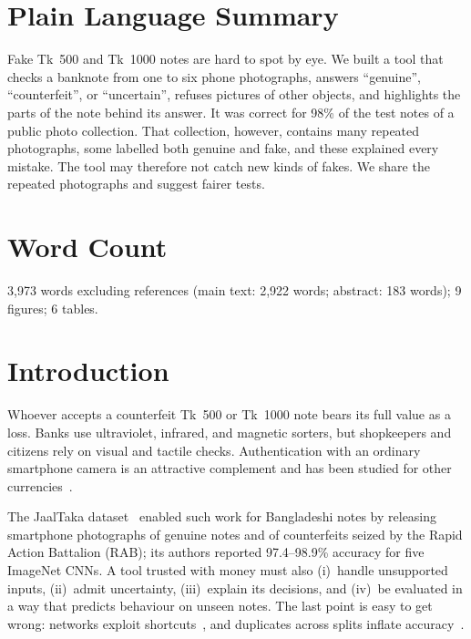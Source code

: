 \documentclass[pdflatex,sn-mathphys-num]{sn-jnl}
\begin{document}
\section*{Plain Language Summary}
Fake Tk~500 and Tk~1000 notes are hard to spot by eye. We built a tool that checks a
banknote from one to six phone photographs, answers ``genuine'', ``counterfeit'', or
``uncertain'', refuses pictures of other objects, and highlights the parts of the note
behind its answer. It was correct for 98\% of the test notes of a public photo
collection. That collection, however, contains many repeated photographs, some labelled
both genuine and fake, and these explained every mistake. The tool may therefore not
catch new kinds of fakes. We share the repeated photographs and suggest fairer tests.

\section*{Word Count}
3{,}973 words excluding references (main text: 2{,}922 words; abstract: 183 words);
9 figures; 6 tables.

\section{Introduction}\label{sec:intro}

Whoever accepts a counterfeit Tk~500 or Tk~1000 note bears its full value as a loss.
Banks use ultraviolet, infrared, and magnetic sorters, but shopkeepers and citizens rely
on visual and tactile checks. Authentication with an ordinary smartphone camera is an
attractive complement and has been studied for other currencies~\cite{pham2020,pham2022}.

The JaalTaka dataset~\cite{piyas2025jaaltaka} enabled such work for Bangladeshi notes by
releasing smartphone photographs of genuine notes and of counterfeits seized by the Rapid
Action Battalion (RAB); its authors reported 97.4--98.9\% accuracy for five ImageNet
CNNs. A tool trusted with money must also (i)~handle unsupported inputs,
(ii)~admit uncertainty, (iii)~explain its decisions, and (iv)~be evaluated in a way that predicts behaviour on
unseen notes. The last point is easy to get wrong: networks exploit
shortcuts~\cite{geirhos2020shortcut}, and duplicates across splits inflate
accuracy~\cite{kaufman2012leakage,barz2020cifair,kapoor2023leakage}.
\end{document}
